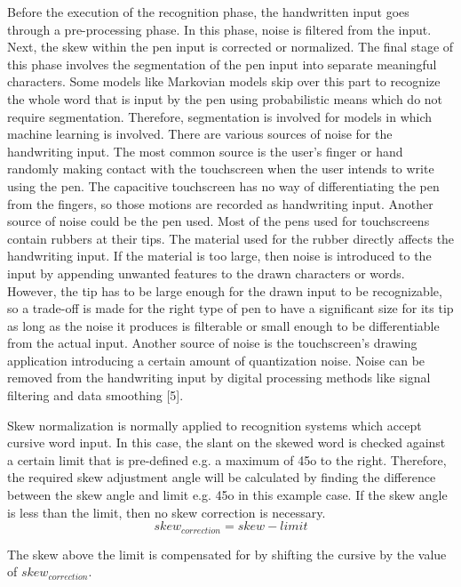 Before the execution of the recognition phase, the handwritten input goes through a pre-processing phase. In this phase, noise is filtered from the input. Next, the skew within the pen input is corrected or normalized. The final stage of this phase involves the segmentation of the pen input into separate meaningful characters. Some models like Markovian models skip over this part to recognize the whole word that is input by the pen using probabilistic means which do not require segmentation. Therefore, segmentation is involved for models in which machine learning is involved.
There are various sources of noise for the handwriting input. The most common source is the user’s finger or hand randomly making contact with the touchscreen when the user intends to write using the pen. The capacitive touchscreen has no way of differentiating the pen from the fingers, so those motions are recorded as handwriting input. Another source of noise could be the pen used. Most of the pens used for touchscreens contain rubbers at their tips. The material used for the rubber directly affects the handwriting input. If the material is too large, then noise is introduced to the input by appending unwanted features to the drawn characters or words. However, the tip has to be large enough for the drawn input to be recognizable, so a trade-off is made for the right type of pen to have a significant size for its tip as long as the noise it produces is filterable or small enough to be differentiable from the actual input. Another source of noise is the touchscreen’s drawing application introducing a certain amount of quantization noise. Noise can be removed from the handwriting input by digital processing methods like signal filtering and data smoothing [5].

Skew normalization is normally applied to recognition systems which accept cursive word input. In this case, the slant on the skewed word is checked against a certain limit that is pre-defined e.g. a maximum of 45o to the right. Therefore, the required skew adjustment angle will be calculated by finding the difference between the skew angle and limit e.g. 45o in this example case. If the skew angle is less than the limit, then no skew correction is necessary.
\begin{equation}
	skew_{correction} = skew - limit
\end{equation}

The skew above the limit is compensated for by shifting the cursive by the value of $skew_{correction}$. 

